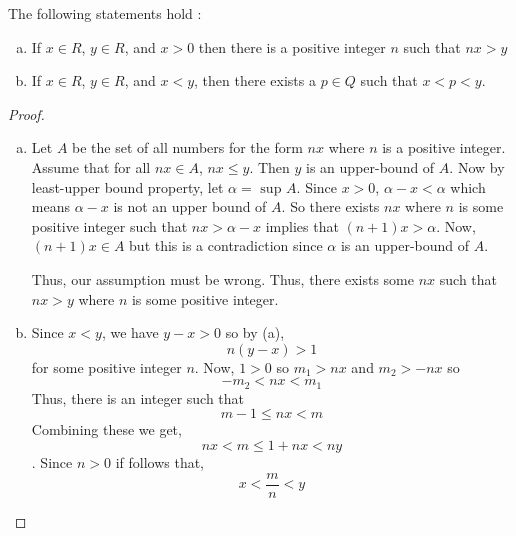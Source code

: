 \begin{thm}
	The following statements hold :
	\begin{enumerate}[a)]
		\item If $x \in R$, $y \in R$, and $x > 0$ then there is a positive integer $n$ such that
		$ nx > y $
		\item If $x \in R$, $y \in R$, and $x < y$, then there exists a $p \in Q$ such that $x < p < y$.
	\end{enumerate}
	\begin{proof}
		\begin{enumerate}[a)]
			\item
			Let $A$ be the set of all numbers for the form $nx$ where $n$ is a positive integer.
			Assume that for all $nx \in A$, $nx \leq y$. Then $y$ is an upper-bound of $A$.
			Now by least-upper bound property, let $\alpha = \text{ sup } A$.
			Since $x > 0$, $\alpha - x < \alpha$ which means $\alpha - x$ is not an upper bound of $A$.
			So there exists $nx$ where $n$ is some positive integer such that $nx > \alpha - x$ implies that $(n+1)x > \alpha$.
			Now, $(n+1)x \in A$ but this is a contradiction since $\alpha$ is an upper-bound of $A$.

			Thus, our assumption must be wrong. Thus, there exists some $nx$ such that $nx > y$ where $n$ is some positive integer.

			\item
			Since $x < y$, we have $y - x > 0$ so by (a), $$ n(y - x) > 1 $$ for some positive integer $n$.
			Now, $1 > 0$ so $m_1 > nx$ and $m_2 > -nx$ so $$ -m_2 < nx < m_1 $$
			Thus, there is an integer such that $$ m - 1 \leq nx < m $$
			Combining these we get, $$ nx < m \leq 1 + nx < ny $$.
			Since $n > 0$ if follows that, $$ x < \frac{m}{n} < y $$
		\end{enumerate}
	\end{proof}
\end{thm}


